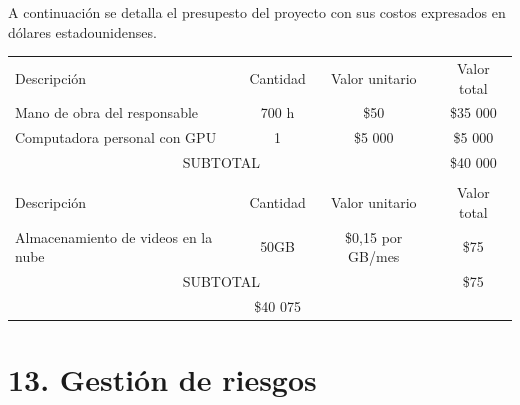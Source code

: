 \documentclass[
11pt, %
]{charter}
\begin{document}
A continuación se detalla el presupesto del proyecto con sus costos expresados en dólares estadounidenses.

\begin{table}[htpb]
\centering
\begin{tabularx}{\linewidth}{@{}|X|c|r|r|@{}}
\hline
\rowcolor[HTML]{C0C0C0} 
\multicolumn{4}{|c|}{\cellcolor[HTML]{C0C0C0}COSTOS DIRECTOS} \\ \hline
\rowcolor[HTML]{C0C0C0} 
Descripción &
  \multicolumn{1}{c|}{\cellcolor[HTML]{C0C0C0}Cantidad} &
  \multicolumn{1}{c|}{\cellcolor[HTML]{C0C0C0}Valor unitario} &
  \multicolumn{1}{c|}{\cellcolor[HTML]{C0C0C0}Valor total} \\ \hline
  
 \multicolumn{1}{|l|}{Mano de obra del responsable} &
  \multicolumn{1}{c|}{700 h} & 
  \multicolumn{1}{c|}{\$50} &
  \multicolumn{1}{c|}{\$35 000} \\ \hline
 
  \multicolumn{1}{|l|}{Computadora personal con GPU} &
 \multicolumn{1}{c|}{1} & 
 \multicolumn{1}{c|}{\$5 000} &
 \multicolumn{1}{c|}{\$5 000} \\ \hline

\multicolumn{3}{|c|}{SUBTOTAL} &
  \multicolumn{1}{c|}{\$40 000} \\ \hline
\rowcolor[HTML]{C0C0C0} 
\multicolumn{4}{|c|}{\cellcolor[HTML]{C0C0C0}COSTOS INDIRECTOS} \\ \hline
\rowcolor[HTML]{C0C0C0} 
Descripción &
  \multicolumn{1}{c|}{\cellcolor[HTML]{C0C0C0}Cantidad} &
  \multicolumn{1}{c|}{\cellcolor[HTML]{C0C0C0}Valor unitario} &
  \multicolumn{1}{c|}{\cellcolor[HTML]{C0C0C0}Valor total} \\ \hline
 \multicolumn{1}{|l|}{Almacenamiento de videos en la nube } &
\multicolumn{1}{c|}{50GB} & 
\multicolumn{1}{c|}{\$0,15 por GB/mes} &
\multicolumn{1}{c|}{\$75} \\ \hline
\multicolumn{3}{|c|}{SUBTOTAL} &
  \multicolumn{1}{c|}{\$75} \\ \hline
\rowcolor[HTML]{C0C0C0}
\multicolumn{3}{|c|}{TOTAL} &
  \multicolumn{1}{|c|}{\$40 075} \\ \hline
\end{tabularx}%
\end{table}


\section{13. Gestión de riesgos}
\label{sec:riesgos}
\end{document}
